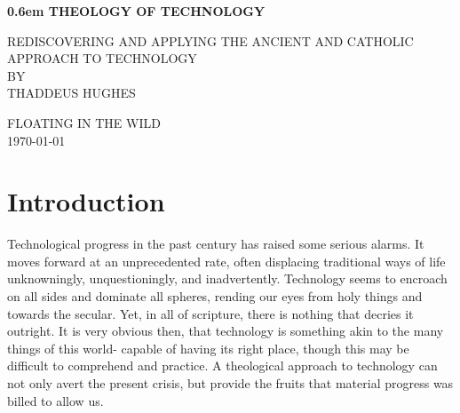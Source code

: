 \documentclass[letterpaper]{article}
\begin{document}
\clearpage
\newcommand\nbvspace[1][3]{\vspace*{\stretch{#1}}}
\newcommand\nbstretchyspace{\spaceskip0.5em plus 0.25em minus 0.25em}
\newcommand{\nbtitlestretch}{\spaceskip0.6em}
\pagestyle{plain}
\begin{center}
  \bfseries
  \nbvspace[1]
  \Huge
  {\nbtitlestretch\huge
    THEOLOGY OF TECHNOLOGY}

  \nbvspace[1]
  \normalsize
  REDISCOVERING AND APPLYING THE ANCIENT AND CATHOLIC APPROACH TO TECHNOLOGY\\

  \nbvspace[1]
  \small BY\\
  \Large THADDEUS HUGHES\\

  \nbvspace[2]

  \nbvspace[3]
  \normalsize

  \large
  FLOATING IN THE WILD \\
  \small \MakeUppercase{\today} \\
\end{center}

\raggedbottom
\tableofcontents

\newpage


\section{Introduction}

Technological progress in the past century has raised some serious alarms. It moves forward at an unprecedented rate, often displacing traditional ways of life unknowningly, unquestioningly, and inadvertently. Technology seems to encroach on all sides and dominate all spheres, rending our eyes from holy things and towards the secular. Yet, in all of scripture, there is nothing that decries it outright. It is very obvious then, that technology is something akin to the many things of this world- capable of having its right place, though this may be difficult to comprehend and practice. A theological approach to technology can not only avert the present crisis, but provide the fruits that material progress was billed to allow us.
\end{document}

